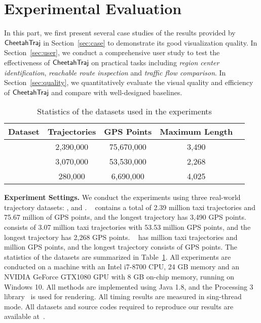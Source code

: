 \section{Experimental Evaluation}\label{sec:exp}

In this part, we first present several case studies of the results provided by $\mathsf{CheetahTraj}$ in Section~\ref{sec:case} to demonstrate its good visualization quality. In Section~\ref{sec:user}, we conduct a comprehensive user study to test the effectiveness of $\mathsf{CheetahTraj}$ on practical tasks including \textit{region center identification}, \textit{reachable route inspection} and \textit{traffic flow comparison}. In Section~\ref{sec:quality}, we quantitatively evaluate the visual quality and efficiency of $\mathsf{CheetahTraj}$ and compare with well-designed baselines.     

\begin{table}
	\centering
	\small
	\caption{Statistics of the datasets used in the experiments}
	\begin{tabular}{|c|c|c|c|c|} \hline
		\textbf{Dataset} & \textbf{Trajectories} & \textbf{GPS Points} & \textbf{Maximum Length}\\ \hline
		\pt{}& 2,390,000 & 75,670,000 & 3,490 \\ \hline
		\sz{}& 3,070,000 & 53,530,000 & 2,268 \\ \hline
		\cd{}& 280,000 & 6,690,000 & 4,025 \\ \hline
	\end{tabular}	\label{tab:dataset}
\end{table}


\vspace{1mm}
\noindent\textbf{Experiment Settings.} We conduct the experiments 
using three real-world trajectory datasets: \pt{}, \sz{} and \cd{}.
\pt{}~\cite{pt} contains a total of 2.39 million taxi trajectories and 75.67 million of GPS points, and the longest trajectory has 3,490 GPS points.
\sz{}~\cite{sz} consists of 3.07 million taxi trajectories with 53.53 million GPS points, and the longest trajectory has 2,268 GPS points. 
\cd{}~\cite{cd} has  million taxi trajectories and  million GPS points, and the longest trajectory consists of  GPS points. The statistics of the datasets are summarized in Table~\ref{tab:dataset}. All experiments are conducted on a machine with an Intel i7-8700 CPU, 24 GB memory and an NVIDIA GeForce GTX1080 GPU with 8 GB on-chip memory, running on Windows 10. All methods are implemented using Java 1.8, and the Processing 3 library~\cite{p3} is used for rendering. All timing results are measured in sing-thread mode. All datasets and source codes required to reproduce our results are available at~\cite{code}.


